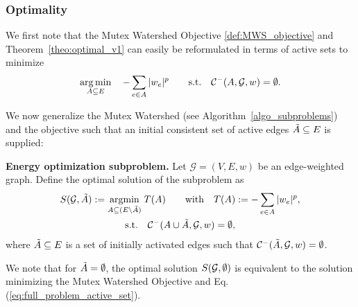 \subsubsection{Optimality}\label{sec:optimilaty_proof}
We first note that the Mutex Watershed Objective \ref{def:MWS_objective} and Theorem~\ref{theo:optimal_v1} can easily be reformulated in terms of active sets to minimize 
\begin{equation}
  \operatorname*{arg\,min}_{A \subseteq E} \quad - \sum_{e \in A}  |w_e|^p  \qquad \textrm{s.t.} \quad \mathcal{C}^-(A,\mathcal{G},w)=\emptyset.  \label{eq:full_problem_active_set}
\end{equation}




\noindent We now generalize the Mutex Watershed (see Algorithm~\ref{algo_subproblems}) and the objective such that an initial consistent set of active edges $\tilde{A} \subseteq E$ is supplied:

\begin{definition} \label{def:general_MWS_obj}
\textbf{Energy optimization subproblem.}
Let \mbox{$\mathcal{G} = (V, E, w)$} be an edge-weighted graph. Define the optimal solution of the subproblem as
\begin{gather} \label{eq:general_MWS_obj}
  S(\mathcal{G},\tilde{A}) := \underset{A \subseteq (E \setminus \tilde{A})}{\text{argmin}} \; T(A) \qquad \textrm{with} \quad T(A) := - \sum_{e \in A} |w_e|^p, \\
  \textrm{s.t.} \quad \mathcal{C}^{-}(A \cup \tilde{A}, \mathcal{G}, w) = \emptyset, \label{eq:def_energy}
\end{gather}
 where $\tilde{A} \subseteq E$ is a set of initially activated edges such that $\mathcal{C}^{-}(\tilde{A}, \mathcal{G}, w) = \emptyset$. 
\end{definition}
\noindent We note that for $\tilde{A} = \emptyset$, the optimal solution $S(\mathcal{G},\emptyset)$ is equivalent to the solution minimizing the Mutex Watershed Objective and Eq. (\ref{eq:full_problem_active_set}).

